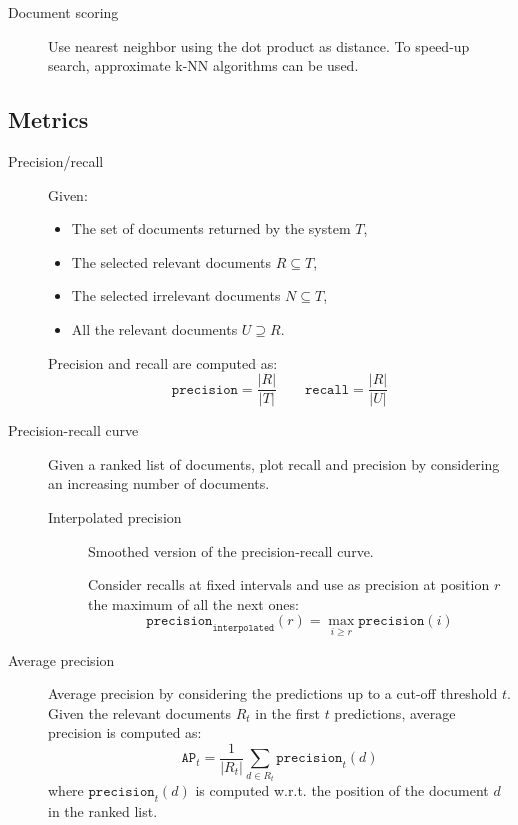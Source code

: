 \begin{description}
        \begin{description}
            \item[Document scoring]
                Use nearest neighbor using the dot product as distance. To speed-up search, approximate k-NN algorithms can be used.
        \end{description}
\end{description}


\subsection{Metrics}

\begin{description}
    \item[Precision/recall] 
        Given:
        \begin{itemize}
            \item The set of documents returned by the system $T$,
            \item The selected relevant documents $R \subseteq T$,
            \item The selected irrelevant documents $N \subseteq T$,
            \item All the relevant documents $U \supseteq R$.
        \end{itemize}
        Precision and recall are computed as:
        \[ 
            \texttt{precision} = \frac{|R|}{|T|} 
            \qquad
            \texttt{recall} = \frac{|R|}{|U|} 
        \]

    \item[Precision-recall curve] 
        Given a ranked list of documents, plot recall and precision by considering an increasing number of documents.

        \begin{description}
            \item[Interpolated precision]
                Smoothed version of the precision-recall curve.

                Consider recalls at fixed intervals and use as precision at position $r$ the maximum of all the next ones:
                \[ \texttt{precision}_\texttt{interpolated}(r) = \max_{i \geq r} \texttt{precision}(i) \]
        \end{description}

    \item[Average precision] 
        Average precision by considering the predictions up to a cut-off threshold $t$. Given the relevant documents $R_t$ in the first $t$ predictions, average precision is computed as:
        \[ \texttt{AP}_t = \frac{1}{|R_t|} \sum_{d \in R_t} \texttt{precision}_t(d) \]
        where $\texttt{precision}_t(d)$ is computed w.r.t. the position of the document $d$ in the ranked list.


\end{description}
